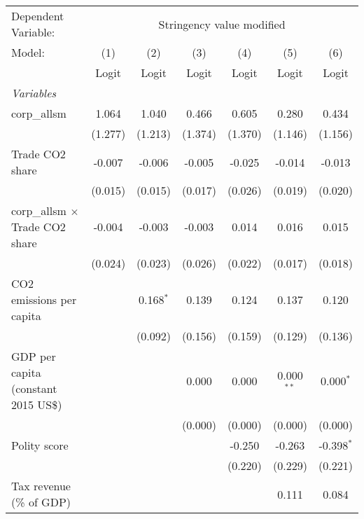 
\begingroup
\centering
\begin{tabular}{lcccccc}
   \toprule
   Dependent Variable: & \multicolumn{6}{c}{Stringency value modified}\\
   Model:                                 & (1)     & (2)         & (3)     & (4)     & (5)          & (6)\\  
                                          &  Logit  & Logit       & Logit   & Logit   & Logit        & Logit\\  
   \midrule
   \emph{Variables}\\
   corp\_allsm                            & 1.064   & 1.040       & 0.466   & 0.605   & 0.280        & 0.434\\   
                                          & (1.277) & (1.213)     & (1.374) & (1.370) & (1.146)      & (1.156)\\   
   Trade CO2 share                        & -0.007  & -0.006      & -0.005  & -0.025  & -0.014       & -0.013\\   
                                          & (0.015) & (0.015)     & (0.017) & (0.026) & (0.019)      & (0.020)\\   
   corp\_allsm $\times$ Trade CO2 share   & -0.004  & -0.003      & -0.003  & 0.014   & 0.016        & 0.015\\   
                                          & (0.024) & (0.023)     & (0.026) & (0.022) & (0.017)      & (0.018)\\   
   CO2 emissions per capita               &         & 0.168$^{*}$ & 0.139   & 0.124   & 0.137        & 0.120\\   
                                          &         & (0.092)     & (0.156) & (0.159) & (0.129)      & (0.136)\\   
   GDP per capita (constant 2015 US\$)    &         &             & 0.000   & 0.000   & 0.000$^{**}$ & 0.000$^{*}$\\   
                                          &         &             & (0.000) & (0.000) & (0.000)      & (0.000)\\   
   Polity score                           &         &             &         & -0.250  & -0.263       & -0.398$^{*}$\\   
                                          &         &             &         & (0.220) & (0.229)      & (0.221)\\   
   Tax revenue (\% of GDP)                &         &             &         &         & 0.111        & 0.084\\   

\end{tabular}
